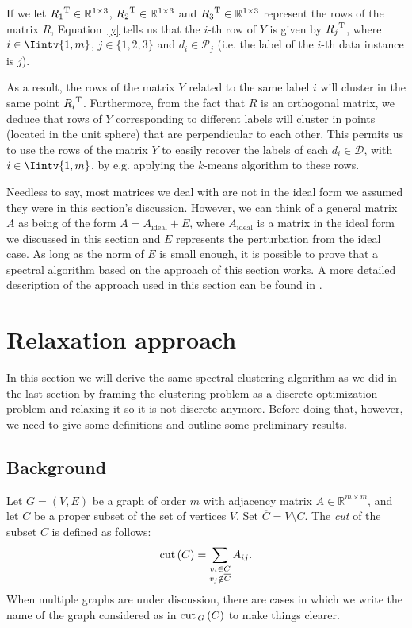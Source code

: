 If we let ${R_1}^{\rm T} \in \mathbb{R}^{1 \times 3}$, ${R_2}^ {\rm T} \in \mathbb{R}^{1 \times 3}$ and ${R_3}^{\rm T} \in \mathbb{R}^{1 \times 3}$ represent the rows of the matrix $R$, Equation~\vref{y} tells us that the $i$-th row of $Y$ is given by ${R_j} ^{\rm T}$, where $i \in \Iintv{1,m}$, $j \in \{1, 2, 3 \}$ and $d_i \in \mathcal P_j$ (i.e. the label of the $i$-th data instance is $j$).

As a result, the rows of the matrix $Y$ related to the same label $i$ will cluster in the same point ${R_i}^{\rm T}$.
Furthermore, from the fact that $R$ is an orthogonal matrix, we deduce that rows of $Y$ corresponding to different labels will cluster in points (located in the unit sphere) that are perpendicular to each other. 
This permits us to use the rows of the matrix $Y$ to easily recover the labels of each $d_i \in \mathcal D$, with $i \in \Iintv{1,m}$, by e.g. applying the $k$-means algorithm to these rows.

Needless to say, most matrices we deal with are not in the ideal form we assumed they were in this section's discussion.
However, we can think of a general matrix $A$ as being of the form $A = A_{\text{ideal}} + E$, where $A_{\text{ideal}}$ is a matrix in the ideal form we discussed in this section and $E$ represents the perturbation from the ideal case.
As long as the norm of $E$ is small enough, it is possible to prove that a spectral algorithm based on the approach of this section works.
A more detailed description of the approach used in this section can be found in \cite{ng}.


\section{Relaxation approach}
In this section we will derive the same spectral clustering algorithm as we did in the last section by framing the clustering problem as a discrete optimization problem and relaxing it so it is not discrete anymore.
Before doing that, however, we need to give some definitions and outline some preliminary results.

\subsection{Background}

\begin{definition}
   Let $G = (V,E)$ be a graph of order $m$ with adjacency matrix $A \in \mathbb R^{m \times m}$, and let $C$ be a proper subset of the set of vertices $V$. 
   Set $\overline{C} = V \setminus C$.
   The \textit{cut} of the subset $C$ is defined as follows:
   \begin{equation}
      \operatorname{cut\,} (C) = \sum_{\substack{v_i \in C \\ v_j \notin \overline C }} A_{ij}.
   \end{equation}
   When multiple graphs are under discussion, there are cases in which we write the name of the graph considered as in $\operatorname{cut\,} _G \,(C)$ to make things clearer.
\end{definition}

